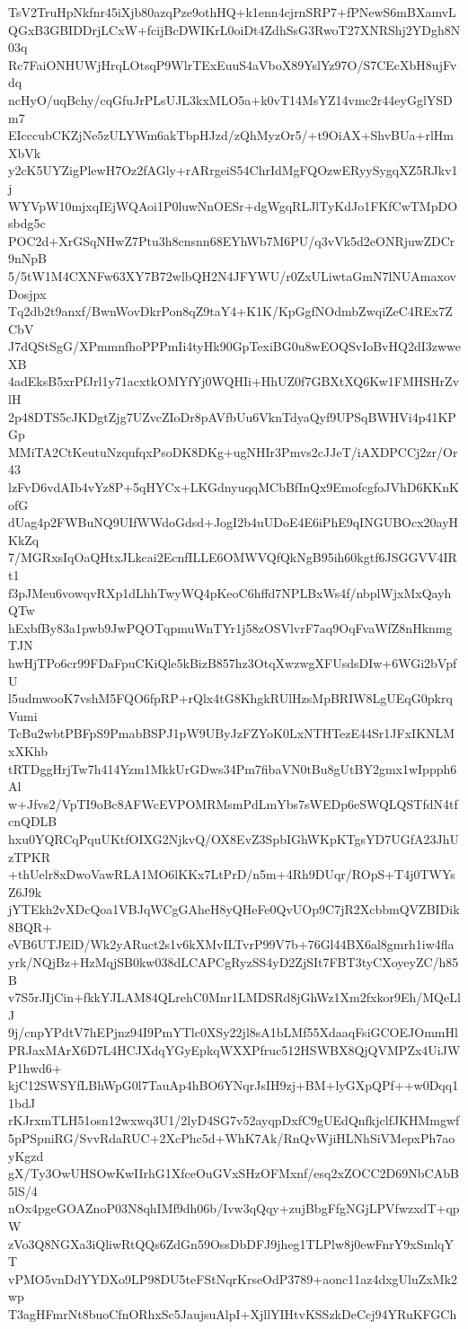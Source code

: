 TsV2TruHpNkfnr45iXjb80azqPze9othHQ+k1enn4cjrnSRP7+fPNewS6mBXamvL
QGxB3GBIDDrjLCxW+fcijBcDWIKrL0oiDt4ZdhSsG3RwoT27XNRShj2YDgh8N03q
Rc7FaiONHUWjHrqLOtsqP9WlrTExEuuS4aVboX89YslYz97O/S7CEcXbH8ujFvdq
ncHyO/uqBchy/cqGfuJrPLsUJL3kxMLO5a+k0vT14MsYZ14vmc2r44eyGglYSDm7
EIcccubCKZjNe5zULYWm6akTbpHJzd/zQhMyzOr5/+t9OiAX+ShvBUa+rlHmXbVk
y2cK5UYZigPlewH7Oz2fAGly+rARrgeiS54ChrIdMgFQOzwERyySygqXZ5RJkv1j
WYVpW10mjxqIEjWQAoi1P0luwNnOESr+dgWgqRLJlTyKdJo1FKfCwTMpDOsbdg5c
POC2d+XrGSqNHwZ7Ptu3h8cnsnn68EYhWb7M6PU/q3vVk5d2eONRjuwZDCr9nNpB
5/5tW1M4CXNFw63XY7B72wlbQH2N4JFYWU/r0ZxULiwtaGmN7lNUAmaxovDosjpx
Tq2db2t9anxf/BwnWovDkrPon8qZ9taY4+K1K/KpGgfNOdmbZwqiZeC4REx7ZCbV
J7dQStSgG/XPmmnfhoPPPmIi4tyHk90GpTexiBG0u8wEOQSvIoBvHQ2dI3zwweXB
4adEksB5xrPfJrl1y71acxtkOMYfYj0WQHIi+HhUZ0f7GBXtXQ6Kw1FMHSHrZvlH
2p48DTS5cJKDgtZjg7UZvcZIoDr8pAVfbUu6VknTdyaQyf9UPSqBWHVi4p41KPGp
MMiTA2CtKeutuNzqufqxPsoDK8DKg+ugNHIr3Pmvs2cJJeT/iAXDPCCj2zr/Or43
lzFvD6vdAIb4vYz8P+5qHYCx+LKGdnyuqqMCbBfInQx9EmofcgfoJVhD6KKnKofG
dUag4p2FWBuNQ9UIfWWdoGdsd+JogI2b4uUDoE4E6iPhE9qINGUBOcx20ayHKkZq
7/MGRxsIqOaQHtxJLkcai2EcnfILLE6OMWVQfQkNgB95ih60kgtf6JSGGVV4IRt1
f3pJMeu6vowqvRXp1dLhhTwyWQ4pKeoC6hffd7NPLBxWs4f/nbplWjxMxQayhQTw
hExbfBy83a1pwb9JwPQOTqpmuWnTYr1j58zOSVlvrF7aq9OqFvaWfZ8nHknmgTJN
hwHjTPo6cr99FDaFpuCKiQle5kBizB857hz3OtqXwzwgXFUsdsDIw+6WGi2bVpfU
l5udmwooK7vshM5FQO6fpRP+rQlx4tG8KhgkRUlHzsMpBRIW8LgUEqG0pkrqVumi
TcBu2wbtPBFpS9PmabBSPJ1pW9UByJzFZYoK0LxNTHTezE44Sr1JFxIKNLMxXKhb
tRTDggHrjTw7h414Yzm1MkkUrGDws34Pm7fibaVN0tBu8gUtBY2gmx1wIppph6Al
w+Jfvs2/VpTI9oBc8AFWcEVPOMRMsmPdLmYbs7sWEDp6eSWQLQSTfdN4tfcnQDLB
hxu0YQRCqPquUKtfOIXG2NjkvQ/OX8EvZ3SpbIGhWKpKTgsYD7UGfA23JhUzTPKR
+thUelr8xDwoVawRLA1MO6lKKx7LtPrD/n5m+4Rh9DUqr/ROpS+T4j0TWYsZ6J9k
jYTEkh2vXDcQoa1VBJqWCgGAheH8yQHeFe0QvUOp9C7jR2XcbbmQVZBIDik8BQR+
eVB6UTJElD/Wk2yARuct2s1v6kXMvILTvrP99V7b+76Gl44BX6al8gmrh1iw4fla
yrk/NQjBz+HzMqjSB0kw038dLCAPCgRyzSS4yD2ZjSIt7FBT3tyCXoyeyZC/h85B
v7S5rJIjCin+fkkYJLAM84QLrehC0Mnr1LMDSRd8jGhWz1Xm2fxkor9Eh/MQeLlJ
9j/cnpYPdtV7hEPjnz94I9PmYTlc0XSy22jl8sA1bLMf55XdaaqFsiGCOEJOmmHl
PRJaxMArX6D7L4HCJXdqYGyEpkqWXXPfruc512HSWBX8QjQVMPZx4UiJWP1hwd6+
kjC12SWSYfLBhWpG0l7TauAp4hBO6YNqrJsIH9zj+BM+lyGXpQPf++w0Dqq11bdJ
rKJrxmTLH51osn12wxwq3U1/2lyD4SG7v52ayqpDxfC9gUEdQnfkjclfJKHMmgwf
5pPSpniRG/SvvRdaRUC+2XcPhc5d+WhK7Ak/RnQvWjiHLNhSiVMepxPh7aoyKgzd
gX/Ty3OwUHSOwKwIIrhG1XfceOuGVxSHzOFMxnf/esq2xZOCC2D69NbCAbB5lS/4
nOx4pgeGOAZnoP03N8qhIMf9dh06b/Ivw3qQqy+zujBbgFfgNGjLPVfwzxdT+qpW
zVo3Q8NGXa3iQliwRtQQs6ZdGn59OssDbDFJ9jheg1TLPlw8j0ewFnrY9xSmlqYT
vPMO5vnDdYYDXo9LP98DU5teFStNqrKrseOdP3789+aonc11az4dxgUluZxMk2wp
T3agHFmrNt8buoCfnORhxSc5JaujsuAlpI+XjllYIHtvKSSzkDeCcj94YRuKFGCh
